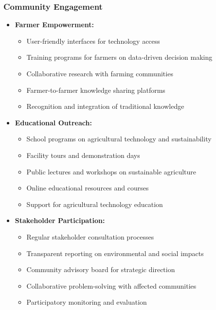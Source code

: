 \subsubsection{Community Engagement}
\begin{itemize}
    \item \textbf{Farmer Empowerment:}
    \begin{itemize}
        \item User-friendly interfaces for technology access
        \item Training programs for farmers on data-driven decision making
        \item Collaborative research with farming communities
        \item Farmer-to-farmer knowledge sharing platforms
        \item Recognition and integration of traditional knowledge
    \end{itemize}
    
    \item \textbf{Educational Outreach:}
    \begin{itemize}
        \item School programs on agricultural technology and sustainability
        \item Facility tours and demonstration days
        \item Public lectures and workshops on sustainable agriculture
        \item Online educational resources and courses
        \item Support for agricultural technology education
    \end{itemize}
    
    \item \textbf{Stakeholder Participation:}
    \begin{itemize}
        \item Regular stakeholder consultation processes
        \item Transparent reporting on environmental and social impacts
        \item Community advisory board for strategic direction
        \item Collaborative problem-solving with affected communities
        \item Participatory monitoring and evaluation
    \end{itemize}
\end{itemize}

